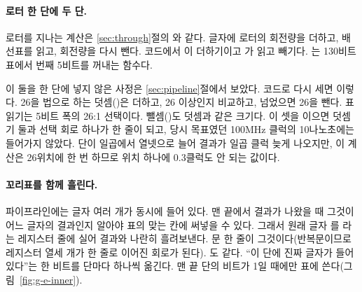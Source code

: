 \paragraph{로터 한 단에 두 단.} 로터를 지나는 계산은 \ref{sec:through}절의 와 같다. 글자에
로터의 회전량을 더하고, 배선표를 읽고, 회전량을 다시 뺀다. 코드에서 이 더하기이고
가 읽고 빼기다. 는 130비트 표에서 번째 5비트를 꺼내는 함수다.

\Why 이 둘을 한 단에 넣지 않은 사정은 \ref{sec:pipeline}절에서 보았다. 코드로 다시 세면 이렇다. 26을 법으로
하는 덧셈()은 더하고, 26 이상인지 비교하고, 넘었으면 26을 뺀다. 표 읽기는 5비트 폭의 26:1
선택이다. 뺄셈()도 덧셈과 같은 크기다. 이 셋을 이으면 덧셈기 둘과 선택 회로 하나가 한 줄이 되고,
당시 목표였던 100MHz 클럭의 10나노초에는 들어가지 않았다. 단이 일곱에서 열넷으로 늘어 결과가 일곱 클럭 늦게
나오지만, 이 계산은 26위치에 한 번 하므로 위치 하나에 0.3클럭도 안 되는 값이다.

\paragraph{꼬리표를 함께 흘린다.} 파이프라인에는 글자 여러 개가 동시에 들어 있다. 맨 끝에서 결과가 나왔을
때 그것이 어느 글자의 결과인지 알아야 표의 맞는 칸에 써넣을 수 있다. 그래서 원래 글자 를
라는 레지스터 줄에 실어 결과와 나란히 흘려보낸다.  문 한 줄이 그것이다(반복문이므로
레지스터 열세 개가 한 줄로 이어진 회로가 된다). 도 같다. ``이 단에 진짜 글자가 들어 있다''는
한 비트를 단마다 하나씩 옮긴다. 맨 끝 단의 비트가 1일 때에만 표에 쓴다(그림~\ref{fig:g-e-inner}).

